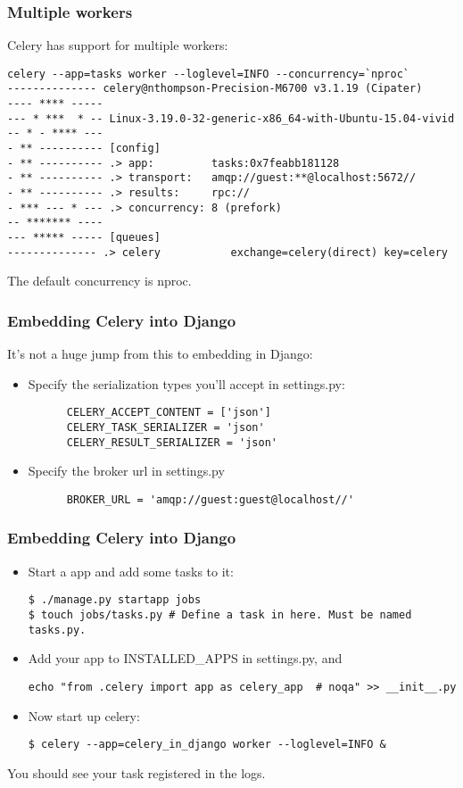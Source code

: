 \documentclass[9pt]{beamer}
\begin{document}
\begin{frame}[fragile]
  \frametitle{Multiple workers}
  Celery has support for multiple workers:
  \begin{verbatim}
celery --app=tasks worker --loglevel=INFO --concurrency=`nproc`
-------------- celery@nthompson-Precision-M6700 v3.1.19 (Cipater)
---- **** -----
--- * ***  * -- Linux-3.19.0-32-generic-x86_64-with-Ubuntu-15.04-vivid
-- * - **** ---
- ** ---------- [config]
- ** ---------- .> app:         tasks:0x7feabb181128
- ** ---------- .> transport:   amqp://guest:**@localhost:5672//
- ** ---------- .> results:     rpc://
- *** --- * --- .> concurrency: 8 (prefork)
-- ******* ----
--- ***** ----- [queues]
-------------- .> celery           exchange=celery(direct) key=celery
  \end{verbatim}
  The default concurrency is nproc.
\end{frame}

\begin{frame}[fragile]
  \frametitle{Embedding Celery into Django}
  It's not a huge jump from this to embedding in Django:
  \begin{itemize}
  \item Specify the serialization types you'll accept in settings.py:
    \begin{verbatim}
      CELERY_ACCEPT_CONTENT = ['json']
      CELERY_TASK_SERIALIZER = 'json'
      CELERY_RESULT_SERIALIZER = 'json'
    \end{verbatim}
    \pause
  \item Specify the broker url in settings.py
    \begin{verbatim}
      BROKER_URL = 'amqp://guest:guest@localhost//'
    \end{verbatim}
  \end{itemize}
\end{frame}

\begin{frame}[fragile]
  \frametitle{Embedding Celery into Django}
  \begin{itemize}
  \item Start a app and add some tasks to it:
    \begin{verbatim}
$ ./manage.py startapp jobs
$ touch jobs/tasks.py # Define a task in here. Must be named tasks.py.
    \end{verbatim}
    \pause
  \item Add your app to INSTALLED\_APPS in settings.py, and
    \begin{verbatim}
echo "from .celery import app as celery_app  # noqa" >> __init__.py
    \end{verbatim}
    \pause
  \item Now start up celery:
    \begin{verbatim}
$ celery --app=celery_in_django worker --loglevel=INFO &
    \end{verbatim}
  \end{itemize}
  You should see your task registered in the logs.
\end{frame}
\end{document}
